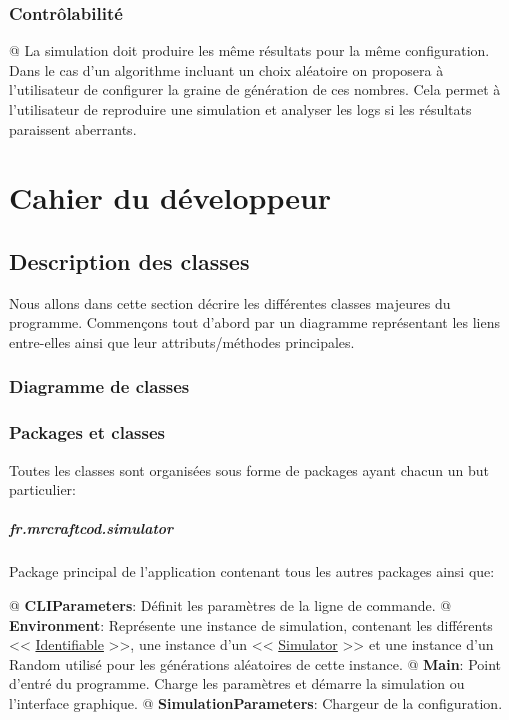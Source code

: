 \documentclass[final]{polytech/polytech}
\newcommand{\class}[1]{\textbf{#1}\label{class:#1}}
\newcommand{\klass}[1]{\hyperref[class:#1]{#1}}
\begin{document}
		\subsection{Contrôlabilité}
			\begin{easylist}
				@ La simulation doit produire les même résultats pour la même configuration.
				Dans le cas d'un algorithme incluant un choix aléatoire on proposera à l'utilisateur de configurer la graine de génération de ces nombres.
				Cela permet à l'utilisateur de reproduire une simulation et analyser les logs si les résultats paraissent aberrants.
			\end{easylist}
					
\chapter{Cahier du développeur}
	\section{Description des classes}
		Nous allons dans cette section décrire les différentes classes majeures du programme.
		Commençons tout d'abord par un diagramme représentant les liens entre-elles ainsi que leur attributs/méthodes principales.
		
		\subsection{Diagramme de classes\label{sec:classes}}
			
		\subsection{Packages et classes}
			Toutes les classes sont organisées sous forme de packages ayant chacun un but particulier:
			
			\paragraph{fr.mrcraftcod.simulator}
				Package principal de l'application contenant tous les autres packages ainsi que:
				\begin{easylist}
					@ \class{CLIParameters}: Définit les paramètres de la ligne de commande.
					@ \class{Environment}: Représente une instance de simulation, contenant les différents << \klass{Identifiable} >>, une instance d'un << \klass{Simulator} >> et une instance d'un Random utilisé pour les générations aléatoires de cette instance.
					@ \class{Main}: Point d'entré du programme. Charge les paramètres et démarre la simulation ou l'interface graphique.
					@ \class{SimulationParameters}: Chargeur de la configuration.
				\end{easylist}
		
\end{document}
